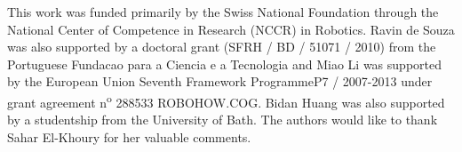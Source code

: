 







\begin{acknowledgements}
This work was funded primarily by the Swiss National Foundation
through the National Center of Competence in Research (NCCR) in
Robotics. Ravin de Souza was also supported by a doctoral grant (SFRH
/ BD / 51071 / 2010) from the Portuguese Fundacao para a Ciencia e a
Tecnologia and Miao Li was supported by the European Union Seventh
Framework ProgrammeP7 / 2007-2013 under grant agreement
n\textsuperscript o 288533 ROBOHOW.COG. Bidan Huang was also supported
by a studentship from the University of Bath.
The authors would like to thank Sahar El-Khoury for her valuable comments.
\end{acknowledgements}








